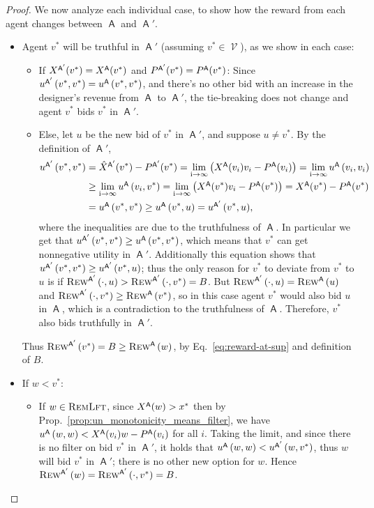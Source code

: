 \documentclass[11pt,letterpaper]{article}
\newcommand{\brackets}[1]{\left( #1 \right)}
\DeclareMathOperator{\A}{\auc{A}}
\DeclareMathOperator{\V}{\mathcal{V}}
\newcommand{\vstar}{{v^*}}
\newcommand{\xstar}{{x^*}}
\DeclareMathOperator{\remlft}{\textsc{RemLft}}
\DeclareMathOperator*{\mylim}{\lim\limits_{i\rightarrow\infty}}
\theoremstyle{plain}
\newcommand{\auc}[1]{\mathsf{#1}}
\begin{document}
\begin{proof}
We now analyze each individual case, to show how the reward from each agent changes between $\A$ and $\A'$.
\begin{itemize}
    \item Agent $\vstar$ will be truthful in $\A'$ (assuming $\vstar\in\V$), as we show in each case:
    \begin{itemize}
            \item If $\x[\A']{\vstar}=\x[\A]{\vstar}$ and $\p[\A']{\vstar}=\p[\A]{\vstar}$: Since $\util[\A']{\vstar}{\vstar}=\util[\A]{\vstar}{\vstar}$, and there's no other bid with an increase in the designer's revenue from $\A$ to $\A'$, the tie-breaking does not change and agent $\vstar$ bids $\vstar$ in $\A'$.
        \item Else, let $u$ be the new bid of $\vstar$ in $\A'$, and suppose $u\neq \vstar$. By the definition of $\A'$,
        \begin{align*}
            \util[\A']{\vstar}{\vstar}&=\xhat[\A']{\vstar}\vstar-\p[\A']{\vstar}=\mylim\brackets{\x[\A]{v_i}v_i-\p[\A]{v_i}}=\mylim\util[\A]{v_i}{v_i}\\
            &\geq\mylim\util[\A]{v_i}{\vstar}=\mylim\brackets{\x[\A]{\vstar}v_i-\p[\A]{\vstar}}=\x[\A]{\vstar}\vstar-\p[\A]{\vstar}\\
            &=\util[\A]{\vstar}{\vstar}\geq\util[\A]{\vstar}{u}=\util[\A']{\vstar}{u},
        \end{align*}
        where the inequalities are due to the truthfulness of $\A$. In particular we get that $\util[\A']{\vstar}{\vstar}\geq \util[\A]{\vstar}{\vstar}$, which means that $\vstar$ can get nonnegative utility in $\A'$. Additionally this equation shows that $\util[\A']{\vstar}{\vstar}\geq \util[\A']{\vstar}{u}$;
        thus the only reason for $\vstar$ to deviate from $\vstar$ to $u$ is if $\rew[\A']{\cdot}{u}>\rew[\A']{\cdot}{\vstar}=B$. But $\rew[\A']{\cdot}{u}=\trew[\A]{u}$ and $\rew[\A']{\cdot}{\vstar}\geq \trew[\A]{\vstar}$, so in this case agent $\vstar$ would also bid $u$ in $\A$, which is a contradiction to the truthfulness of $\A$. Therefore, $\vstar$ also bids truthfully in $\A'$.
    \end{itemize}
    Thus $\trew[\A']{\vstar}=B\geq\trew[\A]{w}$, by Eq.~\ref{eq:reward-at-sup} and definition of $B$.
    \item If $w<\vstar$:
    \begin{itemize}
        \item If $w\in\remlft$, since $\x[\A]{w}>\xstar$ then by Prop.~\ref{prop:un_monotonicity_means_filter}, we have $\util[\A]{w}{w}<\utilformula[\A]{w}{v_i}$ for all $i$. Taking the limit, and since there is no filter on bid $\vstar$ in $\A'$, it holds that $\util[\A]{w}{w}<\util[\A']{w}{\vstar}$, thus $w$ will bid $\vstar$ in $\A'$; there is no other new option for $w$. Hence $\trew[\A']{w}=\rew[\A']{\cdot}{\vstar}=B$.

\end{itemize}
\end{itemize}
\end{proof}
\end{document}
